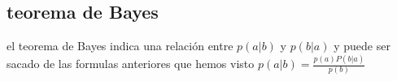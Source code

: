 \subsection{teorema de Bayes}
el teorema de Bayes indica una relación entre $p(a|b)$ y $p(b|a)$ y puede ser sacado de las formulas anteriores que hemos visto $p(a|b)=\frac{p(a)P(b|a)}{p(b)}$
